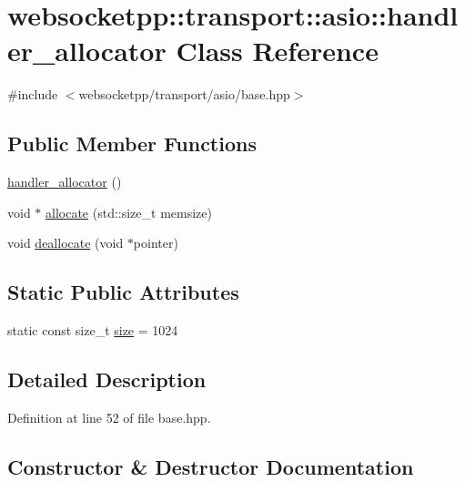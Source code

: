 \hypertarget{classwebsocketpp_1_1transport_1_1asio_1_1handler__allocator}{}\section{websocketpp\+:\+:transport\+:\+:asio\+:\+:handler\+\_\+allocator Class Reference}
\label{classwebsocketpp_1_1transport_1_1asio_1_1handler__allocator}


{\ttfamily \#include $<$websocketpp/transport/asio/base.\+hpp$>$}

\subsection*{Public Member Functions}
\begin{DoxyCompactItemize}
\item 
\hyperlink{classwebsocketpp_1_1transport_1_1asio_1_1handler__allocator_a3639b1584c3410758649846529b4c755}{handler\+\_\+allocator} ()
\item 
void $\ast$ \hyperlink{classwebsocketpp_1_1transport_1_1asio_1_1handler__allocator_a526b360a715196645ce1da14c59ae6c7}{allocate} (std\+::size\+\_\+t memsize)
\item 
void \hyperlink{classwebsocketpp_1_1transport_1_1asio_1_1handler__allocator_a8ba1b99267d13036f866f1e10d925efc}{deallocate} (void $\ast$pointer)
\end{DoxyCompactItemize}
\subsection*{Static Public Attributes}
\begin{DoxyCompactItemize}
\item 
static const size\+\_\+t \hyperlink{classwebsocketpp_1_1transport_1_1asio_1_1handler__allocator_aea8d0b7af2997fc2e84e95e459c16ccb}{size} = 1024
\end{DoxyCompactItemize}


\subsection{Detailed Description}


Definition at line 52 of file base.\+hpp.



\subsection{Constructor \& Destructor Documentation}
\hypertarget{classwebsocketpp_1_1transport_1_1asio_1_1handler__allocator_a3639b1584c3410758649846529b4c755}{}
